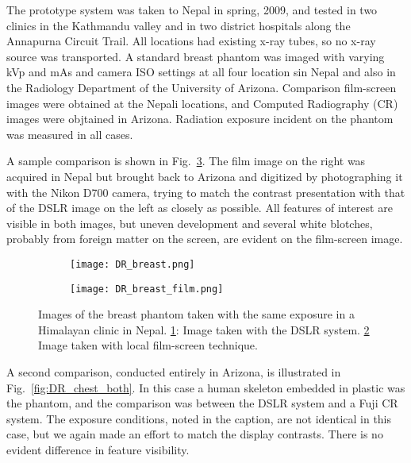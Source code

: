 The prototype system was taken to Nepal in spring, 2009, and tested in two clinics in the Kathmandu valley and in two district hospitals along the Annapurna Circuit Trail.  All locations had existing x-ray tubes, so no x-ray source was transported. A standard breast phantom was imaged with varying kVp and mAs and camera ISO settings at all four location sin Nepal and also in the Radiology Department of the University of Arizona.  Comparison film-screen images were obtained at the Nepali locations, and Computed Radiography (CR) images were objtained in Arizona.  Radiation exposure incident on the phantom was measured in all cases.

A sample comparison is shown in Fig.~\ref{fig:DR_breast_both}. The film image on the right was acquired in Nepal but brought back to Arizona and digitized by photographing it with the Nikon D700 camera, trying to match the contrast presentation with that of the DSLR image on the left as closely as possible. All features of interest are visible in both images, but uneven development and several white blotches, probably from foreign matter on the screen, are evident on the film-screen image.

\begin{figure}[h]
\centering
	\begin{subfigure}[b]{0.4\linewidth}
		\texttt{[image: DR\_breast.png]}
		\caption{}
		\label{fig:DR_breast}
	\end{subfigure}
	\hspace{1 cm}
	\begin{subfigure}[b]{0.4\linewidth}
		\texttt{[image: DR\_breast\_film.png]}
		\caption{}
		\label{fig:DR_breast_film}
	\end{subfigure}
	\caption{Images of the breast phantom taken with the same exposure in a Himalayan clinic in Nepal. \ref{fig:DR_breast}: Image taken with the DSLR system. \ref{fig:DR_breast_film} Image taken with local film-screen technique.}
	\label{fig:DR_breast_both}
\end{figure}

A second comparison, conducted entirely in Arizona, is illustrated in Fig.~\ref{fig:DR_chest_both}. In this case a human skeleton embedded in plastic was the phantom, and the comparison was between the DSLR system and a Fuji CR system. The exposure conditions, noted in the caption, are not identical in this case, but we again made an effort to match the display contrasts. There is no evident difference in feature visibility.


